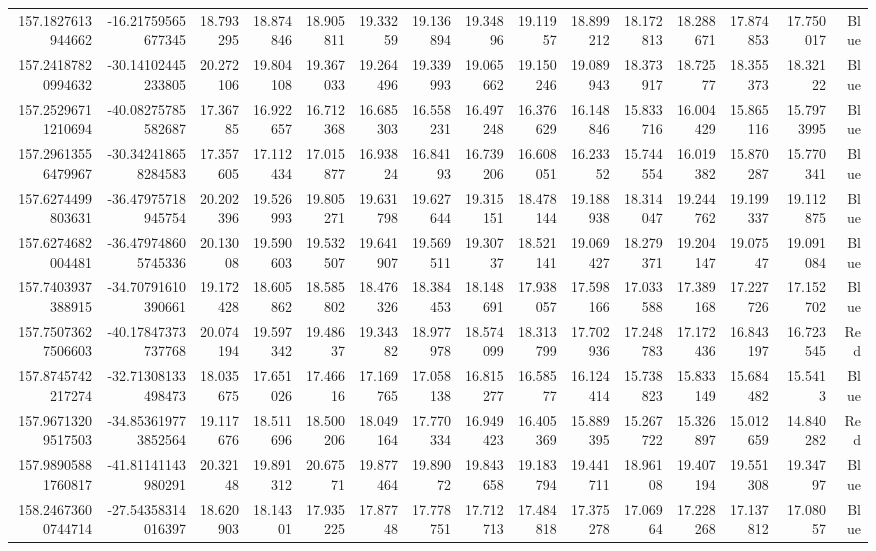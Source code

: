 \begin{center}
\begin{longtable}{rrrrrrrrrrrrrrr}
157.1827613944662 & -16.21759565677345 & 18.793295 & 18.874846 & 18.905811 & 19.33259 & 19.136894 & 19.34896 & 19.11957 & 18.899212 & 18.172813 & 18.288671 & 17.874853 & 17.750017 & Blue \\
157.24187820994632 & -30.14102445233805 & 20.272106 & 19.804108 & 19.367033 & 19.264496 & 19.339993 & 19.065662 & 19.150246 & 19.089943 & 18.373917 & 18.72577 & 18.355373 & 18.32122 & Blue \\
157.25296711210694 & -40.08275785582687 & 17.36785 & 16.922657 & 16.712368 & 16.685303 & 16.558231 & 16.497248 & 16.376629 & 16.148846 & 15.833716 & 16.004429 & 15.865116 & 15.7973995 & Blue \\
157.29613556479967 & -30.342418658284583 & 17.357605 & 17.112434 & 17.015877 & 16.93824 & 16.84193 & 16.739206 & 16.608051 & 16.23352 & 15.744554 & 16.019382 & 15.870287 & 15.770341 & Blue \\
157.6274499803631 & -36.47975718945754 & 20.202396 & 19.526993 & 19.805271 & 19.631798 & 19.627644 & 19.315151 & 18.478144 & 19.188938 & 18.314047 & 19.244762 & 19.199337 & 19.112875 & Blue \\
157.6274682004481 & -36.479748605745336 & 20.13008 & 19.590603 & 19.532507 & 19.641907 & 19.569511 & 19.30737 & 18.521141 & 19.069427 & 18.279371 & 19.204147 & 19.07547 & 19.091084 & Blue \\
157.7403937388915 & -34.70791610390661 & 19.172428 & 18.605862 & 18.585802 & 18.476326 & 18.384453 & 18.148691 & 17.938057 & 17.598166 & 17.033588 & 17.389168 & 17.227726 & 17.152702 & Blue \\
157.75073627506603 & -40.17847373737768 & 20.074194 & 19.597342 & 19.48637 & 19.34382 & 18.977978 & 18.574099 & 18.313799 & 17.702936 & 17.248783 & 17.172436 & 16.843197 & 16.723545 & Red \\
157.8745742217274 & -32.71308133498473 & 18.035675 & 17.651026 & 17.46616 & 17.169765 & 17.058138 & 16.815277 & 16.58577 & 16.124414 & 15.738823 & 15.833149 & 15.684482 & 15.5413 & Blue \\
157.96713209517503 & -34.853619773852564 & 19.117676 & 18.511696 & 18.500206 & 18.049164 & 17.770334 & 16.949423 & 16.405369 & 15.889395 & 15.267722 & 15.326897 & 15.012659 & 14.840282 & Red \\
157.98905881760817 & -41.81141143980291 & 20.32148 & 19.891312 & 20.67571 & 19.877464 & 19.89072 & 19.843658 & 19.183794 & 19.441711 & 18.96108 & 19.407194 & 19.551308 & 19.34797 & Blue \\
158.24673600744714 & -27.54358314016397 & 18.620903 & 18.14301 & 17.935225 & 17.87748 & 17.778751 & 17.712713 & 17.484818 & 17.375278 & 17.06964 & 17.228268 & 17.137812 & 17.08057 & Blue \\

\end{longtable}
\end{center}
